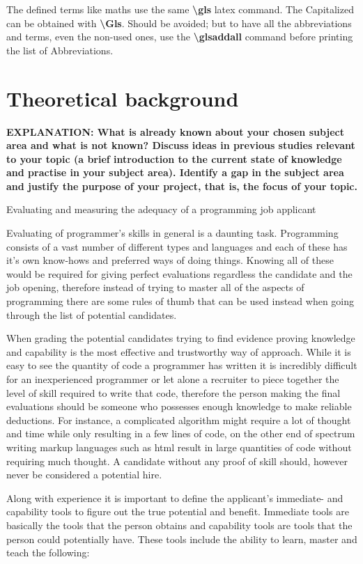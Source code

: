 \documentclass[11pt,a4paper,oneside,article]{memoir}
\begin{document}
The defined terms like \gls{maths} use the same \textbf{\textbackslash{}gls} \gls{latex} command. The Capitalized can be obtained with \textbf{\textbackslash{}Gls}. Should be avoided; but to have all the abbreviations and terms, even the non-used ones, use the \textbf{\textbackslash{}glsaddall} command before printing the list of Abbreviations. 

\chapter{Theoretical background}
\textbf{EXPLANATION: What is already known about your chosen subject area and what is not known? Discuss ideas in previous studies relevant to your topic (a brief introduction to the current state of knowledge and practise in your subject area). Identify a gap in the subject area and justify the purpose of your project, that is, the focus of your topic.}

Evaluating and measuring the adequacy of a programming job applicant

Evaluating of programmer's skills in general is a daunting task. Programming consists of a vast number of different types and languages and each of these has it's own know-hows and preferred ways of doing things. Knowing all of these would be required for giving perfect evaluations regardless the candidate and the job opening, therefore instead of trying to master all of the aspects of programming there are some rules of thumb that can be used instead when going through the list of potential candidates.

When grading the potential candidates trying to find evidence proving knowledge and capability is the most effective and trustworthy way of approach.\cite[p.~6-7]{mcculler:book} While it is easy to see the quantity of code a programmer has written it is incredibly difficult for an inexperienced programmer or let alone a recruiter to piece together the level of skill required to write that code, therefore the person making the final evaluations should be someone who possesses enough knowledge to make reliable deductions. For instance, a complicated algorithm might require a lot of thought and time while only resulting in a few lines of code, on the other end of spectrum writing markup languages such as \gls{html} result in large quantities of code without requiring much thought. A candidate without any proof of skill should, however never be considered a potential hire.

Along with experience it is important to define the applicant's immediate- and capability tools to figure out the true potential and benefit. Immediate tools are basically the tools that the person obtains and capability tools are tools that the person could potentially have. These tools include the ability to learn, master and teach the following:
\end{document}
